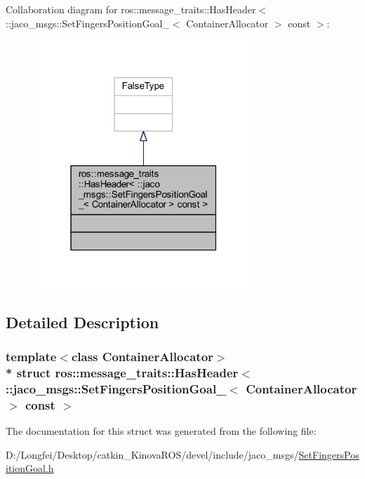 Collaboration diagram for ros\+:\+:message\+\_\+traits\+:\+:Has\+Header$<$ \+:\+:jaco\+\_\+msgs\+:\+:Set\+Fingers\+Position\+Goal\+\_\+$<$ Container\+Allocator $>$ const $>$\+:
\nopagebreak
\begin{figure}[H]
\begin{center}
\leavevmode
\includegraphics[width=235pt]{d3/da5/structros_1_1message__traits_1_1HasHeader_3_01_1_1jaco__msgs_1_1SetFingersPositionGoal___3_01Con6dbfdb07ecc7e6353ef59f08511b4b80}
\end{center}
\end{figure}


\subsection{Detailed Description}
\subsubsection*{template$<$class Container\+Allocator$>$\\*
struct ros\+::message\+\_\+traits\+::\+Has\+Header$<$ \+::jaco\+\_\+msgs\+::\+Set\+Fingers\+Position\+Goal\+\_\+$<$ Container\+Allocator $>$ const  $>$}



The documentation for this struct was generated from the following file\+:\begin{DoxyCompactItemize}
\item 
D\+:/\+Longfei/\+Desktop/catkin\+\_\+\+Kinova\+R\+O\+S/devel/include/jaco\+\_\+msgs/\hyperlink{SetFingersPositionGoal_8h}{Set\+Fingers\+Position\+Goal.\+h}\end{DoxyCompactItemize}
